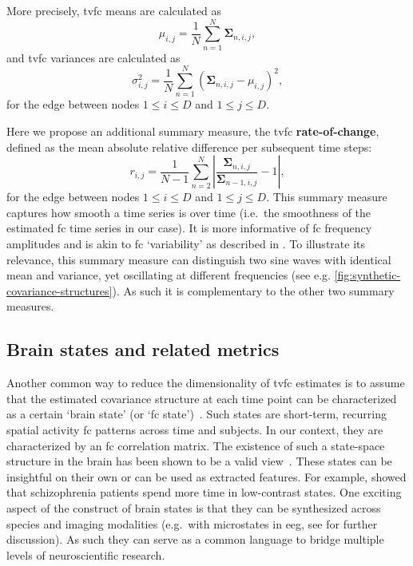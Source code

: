 More precisely, \gls{tvfc} means are calculated as
\begin{equation}
  \mu_{i,j} = \frac{1}{N} \sum_{n=1}^N \mathbf{\Sigma}_{n,i,j},
\end{equation}
and \gls{tvfc} variances are calculated as
\begin{equation}
  \sigma^2_{i,j} = \frac{1}{N} \sum_{n=1}^N (\mathbf{\Sigma}_{n,i,j} - \mu_{i,j})^2,
\end{equation}
for the edge between nodes $1 \leq i \leq D$ and $1 \leq j \leq D$.

Here we propose an additional summary measure, the \gls{tvfc} \textbf{rate-of-change}, defined as the mean absolute relative difference per subsequent time steps:
\begin{equation}
  r_{i,j} = \frac{1}{N-1} \sum_{n=2}^N | \frac{\mathbf{\Sigma}_{n,i,j}}{\mathbf{\Sigma}_{n-1,i,j}} - 1 |,
\end{equation}
for the edge between nodes $1 \leq i \leq D$ and $1 \leq j \leq D$.
This summary measure captures how smooth a time series is over time (i.e.~the smoothness of the estimated \gls{fc} time series in our case).
It is more informative of \gls{fc} frequency amplitudes and is akin to \gls{fc} `variability' as described in \textcite{Allen2014}.
To illustrate its relevance, this summary measure can distinguish two sine waves with identical mean and variance, yet oscillating at different frequencies (see e.g. \cref{fig:synthetic-covariance-structures}).
As such it is complementary to the other two summary measures.

\subsection{Brain states and related metrics}\label{subsec:brain-states}

Another common way to reduce the dimensionality of \gls{tvfc} estimates is to assume that the estimated covariance structure at each time point can be characterized as a certain `brain state' (or `\gls{fc} state')~\parencite{Kringelbach2020}.
Such states are short-term, recurring spatial activity \gls{fc} patterns across time and subjects.
In our context, they are characterized by an \gls{fc} correlation matrix.
%
The existence of such a state-space structure in the brain has been shown to be a valid view~\parencite{Deco2015}.
%
These states can be insightful on their own or can be used as extracted features.
For example, \textcite{Rashid2016} showed that schizophrenia patients spend more time in low-contrast states.
One exciting aspect of the construct of brain states is that they can be synthesized across species and imaging modalities (e.g.~with microstates in \gls{eeg}, see \textcite{Allen2014} for further discussion).
As such they can serve as a common language to bridge multiple levels of neuroscientific research.

